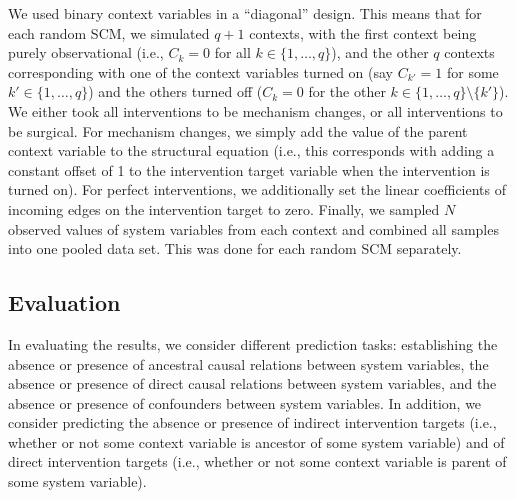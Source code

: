 \documentclass[twoside,11pt]{article}
\newcommand{\Joris}[1]{{\color{blue}#1}}
\begin{document}
We used binary context variables in a ``diagonal'' design. This means that for
each random SCM, we simulated $q+1$ contexts, with the first context
being purely observational (i.e., $C_k = 0$ for all $k\in\{1,\dots,q\}$), and the 
other $q$ contexts corresponding with one of the context variables turned on
(say $C_{k'} = 1$ for some $k' \in \{1,\dots,q\}$) and the others turned off ($C_k = 0$
for the other $k \in \{1,\dots,q\} \setminus \{k'\}$). We either took all interventions
to be mechanism changes, or all interventions to be surgical.
For mechanism changes, we simply add the value of the parent context variable
to the structural equation (i.e., this corresponds with adding a constant offset
of 1 to the intervention target variable when the intervention is turned on). 
For perfect interventions, we additionally set the linear coefficients of incoming 
edges on the intervention target to zero. 
Finally, we sampled $N$ observed values of system variables from each context and
combined all samples into one pooled data set. This was done for each random SCM
separately.


\subsection{Evaluation}

In evaluating the results, we consider different prediction tasks: establishing 
the absence or presence of ancestral causal relations between system variables,
the absence or presence of direct causal relations between system variables, and
the absence or presence of confounders between system variables. 
In addition, we consider predicting the
absence or presence of indirect intervention targets (i.e., whether or not some 
context variable is ancestor of some system variable) and of direct intervention
targets (i.e., whether or not some context variable is parent of some system variable).

\end{document}
